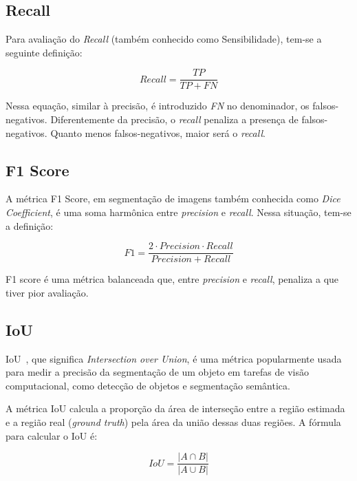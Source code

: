 \subsection{Recall}\label{sec:recall}

Para avaliação do \textit{Recall} (também conhecido como Sensibilidade), tem-se a seguinte definição:

\begin{equation}\label{eq:recall}
  Recall = \dfrac{TP}{TP + FN}
\end{equation}

Nessa equação, similar à precisão, é introduzido \textit{FN} no denominador,
os falsos-negativos. Diferentemente da precisão, o \textit{recall} penaliza
a presença de falsos-negativos. Quanto menos falsos-negativos, maior
será o \textit{recall}.

\subsection{F1 Score}\label{sec:f1}

A métrica F1 Score, em segmentação de imagens também conhecida como
\textit{Dice Coefficient}, é uma soma harmônica entre \textit{precision} e
\textit{recall}. Nessa situação, tem-se a definição:


\begin{equation}\label{eq:recall}
  F1 = \dfrac{2 \cdot Precision \cdot Recall}{Precision + Recall}
\end{equation}

F1 score é uma métrica balanceada que, entre \textit{precision} e \textit{recall},
penaliza a que tiver pior avaliação.

\subsection{IoU}\label{sec:iou}

IoU~\cite{rezatofighi2019generalized}, que significa
\textit{Intersection over Union}, é uma métrica popularmente usada
para medir a precisão da segmentação de um objeto em tarefas de visão
computacional, como detecção de objetos e segmentação semântica.

A métrica IoU calcula a proporção da área de interseção entre a região
estimada e a região real (\textit{ground truth}) pela área da união dessas duas
regiões. A fórmula para calcular o IoU é:

\begin{equation}\label{eq:iou}
  IoU = \dfrac{\left| A \cap B \right|}{\left| A \cup B \right|}
\end{equation}


